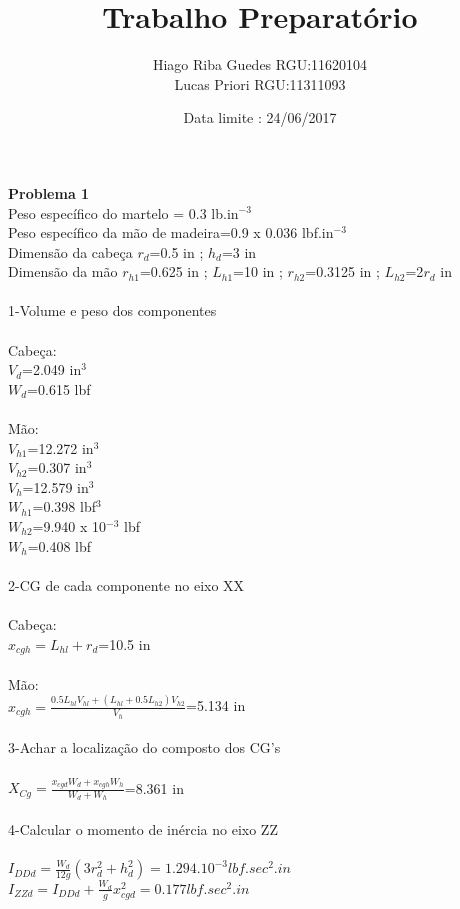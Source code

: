 \documentclass[11pt,a4paper]{article}
\title{Trabalho Preparatório}
\author{Hiago Riba Guedes RGU:11620104\\ Lucas Priori RGU:11311093}
\date{Data limite : 24/06/2017}
\begin{document}
\maketitle

\textbf{Problema 1}\\
Peso específico do martelo = 0.3 lb.in$^{-3}$\\
Peso específico da mão de madeira=0.9 x 0.036 lbf.in$^{-3}$\\
Dimensão da cabeça $r_d$=0.5 in ; $h_d$=3 in\\
Dimensão da mão $r_{h1}$=0.625 in ; $L_{h1}$=10 in ;
$r_{h2}$=0.3125 in ; $L_{h2}$=2$r_d$ in \\\\
1-Volume e peso dos componentes \\\\
Cabeça:\\
$V_d$=2.049 in$^3$\\
$W_d$=0.615 lbf\\
\\
Mão:\\
$V_{h1}$=12.272 in$^3$\\
$V_{h2}$=0.307 in$^3$\\
$V_h$=12.579 in$^3$\\
$W_{h1}$=0.398 lbf$^3$\\
$W_{h2}$=9.940 x 10$^{-3}$ lbf\\
$W_h$=0.408 lbf\\
\\
2-CG de cada componente no eixo XX\\
\\
Cabeça:\\
$x_{cgh}=L_{hl}+r_d$=10.5 in\\\\
Mão:\\
$x_{cgh}=\frac{0.5L_{hl}V_{hl}+(L_{hl}+0.5L_{h2})V_{h2}}{V_h}$=5.134 in\\\\
3-Achar a localização do composto dos CG's \\\\
$X_{Cg}=\frac{x_{cgd}W_d +x_{cgh}W_h}{W_d + W_h}$=8.361 in \\\\
4-Calcular o momento de inércia no eixo ZZ\\\\
$I_{DDd}=\frac{W_d}{12g}(3r_d^2+h_d^2)=1.294.10^{-3}lbf.sec^2.in$\\
$I_{ZZd}=I_{DDd}+\frac{W_d}{g}x_{cgd}^2=0.177lbf.sec^2.in$\\\\
\end{document}
